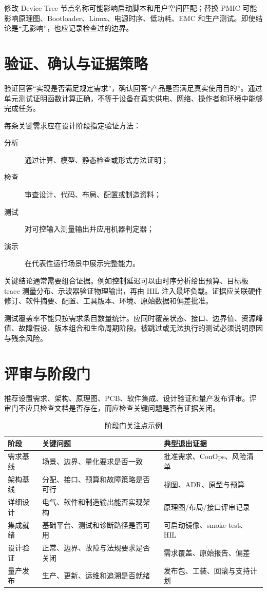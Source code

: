 修改 Device Tree 节点名称可能影响启动脚本和用户空间匹配；替换 PMIC 可能影响原理图、Bootloader、Linux、电源时序、低功耗、EMC 和生产测试。即使结论是“无影响”，也应记录检查过的边界。

\section{验证、确认与证据策略}

验证回答“实现是否满足规定需求”，确认回答“产品是否满足真实使用目的”。通过单元测试证明函数计算正确，不等于设备在真实供电、网络、操作者和环境中能够完成任务。

每条关键需求应在设计阶段指定验证方法：

\begin{description}
  \item[分析] 通过计算、模型、静态检查或形式方法证明；
  \item[检查] 审查设计、代码、布局、配置或制造资料；
  \item[测试] 对可控输入测量输出并应用机器判定器；
  \item[演示] 在代表性运行场景中展示完整能力。
\end{description}

关键结论通常需要组合证据。例如控制延迟可以由时序分析给出预算、目标板 trace 测量分布、示波器验证物理输出，再由 HIL 注入最坏负载。证据应关联硬件修订、软件摘要、配置、工具版本、环境、原始数据和偏差批准。

测试覆盖率不能只按需求条目数量统计。应同时覆盖状态、接口、边界值、资源峰值、故障假设、版本组合和生命周期阶段。被跳过或无法执行的测试必须说明原因与残余风险。

\section{评审与阶段门}

推荐设置需求、架构、原理图、PCB、软件集成、设计验证和量产发布评审。评审门不应只检查文档是否存在，而应检查关键问题是否有证据关闭。

\begin{table}[H]
  \centering
  \caption{阶段门关注点示例}
  \begin{tabular}{p{27mm}p{70mm}p{42mm}}
    \hline
    阶段 & 关键问题 & 典型退出证据 \\
    \hline
    需求基线 & 场景、边界、量化要求是否一致 & 批准需求、ConOps、风险清单 \\
    架构基线 & 分配、接口、预算和故障策略是否可行 & 视图、ADR、原型与预算 \\
    详细设计 & 电气、软件和制造输出能否实现架构 & 原理图/布局/接口评审记录 \\
    集成就绪 & 基础平台、测试和诊断路径是否可用 & 可启动镜像、smoke test、HIL \\
    设计验证 & 正常、边界、故障与法规要求是否关闭 & 需求覆盖、原始报告、偏差 \\
    量产发布 & 生产、更新、运维和追溯是否就绪 & 发布包、工装、回滚与支持计划 \\
    \hline
  \end{tabular}
\end{table}

